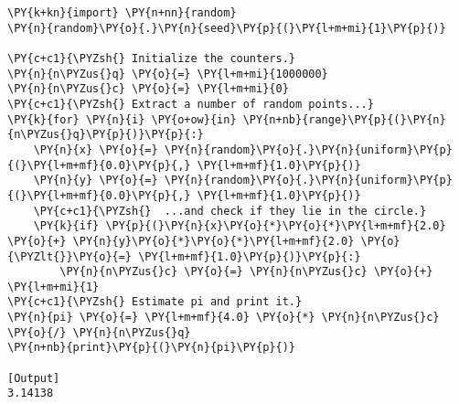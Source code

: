 \begin{Verbatim}[label=\makebox{\href{https://bitbucket.org/lbaldini/statnotes/src/master/snippets/mc\_pi.py}{https://bitbucket.org/.../mc\_pi.py}},commandchars=\\\{\}]
\PY{k+kn}{import} \PY{n+nn}{random}
\PY{n}{random}\PY{o}{.}\PY{n}{seed}\PY{p}{(}\PY{l+m+mi}{1}\PY{p}{)}

\PY{c+c1}{\PYZsh{} Initialize the counters.}
\PY{n}{n\PYZus{}q} \PY{o}{=} \PY{l+m+mi}{1000000}
\PY{n}{n\PYZus{}c} \PY{o}{=} \PY{l+m+mi}{0}
\PY{c+c1}{\PYZsh{} Extract a number of random points...}
\PY{k}{for} \PY{n}{i} \PY{o+ow}{in} \PY{n+nb}{range}\PY{p}{(}\PY{n}{n\PYZus{}q}\PY{p}{)}\PY{p}{:}
    \PY{n}{x} \PY{o}{=} \PY{n}{random}\PY{o}{.}\PY{n}{uniform}\PY{p}{(}\PY{l+m+mf}{0.0}\PY{p}{,} \PY{l+m+mf}{1.0}\PY{p}{)}
    \PY{n}{y} \PY{o}{=} \PY{n}{random}\PY{o}{.}\PY{n}{uniform}\PY{p}{(}\PY{l+m+mf}{0.0}\PY{p}{,} \PY{l+m+mf}{1.0}\PY{p}{)}
    \PY{c+c1}{\PYZsh{}  ...and check if they lie in the circle.}
    \PY{k}{if} \PY{p}{(}\PY{n}{x}\PY{o}{*}\PY{o}{*}\PY{l+m+mf}{2.0} \PY{o}{+} \PY{n}{y}\PY{o}{*}\PY{o}{*}\PY{l+m+mf}{2.0} \PY{o}{\PYZlt{}}\PY{o}{=} \PY{l+m+mf}{1.0}\PY{p}{)}\PY{p}{:}
        \PY{n}{n\PYZus{}c} \PY{o}{=} \PY{n}{n\PYZus{}c} \PY{o}{+} \PY{l+m+mi}{1}
\PY{c+c1}{\PYZsh{} Estimate pi and print it.}
\PY{n}{pi} \PY{o}{=} \PY{l+m+mf}{4.0} \PY{o}{*} \PY{n}{n\PYZus{}c} \PY{o}{/} \PY{n}{n\PYZus{}q}
\PY{n+nb}{print}\PY{p}{(}\PY{n}{pi}\PY{p}{)}

[Output]
3.14138
\end{Verbatim}